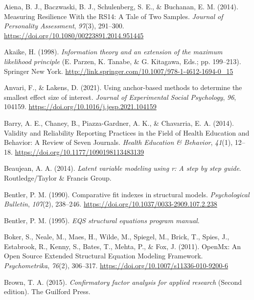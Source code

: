 \documentclass[
  man]{apa7}
\newlength{\cslhangindent}
\newlength{\cslentryspacingunit} %
\newenvironment{CSLReferences}[2] %
 {%
  \setlength{\parindent}{0pt}
  \ifodd #1
  \let\oldpar\par
  \def\par{\hangindent=\cslhangindent\oldpar}
  \fi
  \setlength{\parskip}{#2\cslentryspacingunit}
 }%
 {}
\begin{document}
\hypertarget{refs}{}
\begin{CSLReferences}{1}{0}
\leavevmode{}%
Aiena, B. J., Baczwaski, B. J., Schulenberg, S. E., \& Buchanan, E. M. (2014). Measuring Resilience With the RS{\textendash}14: A Tale of Two Samples. \emph{Journal of Personality Assessment}, \emph{97}(3), 291--300. \url{https://doi.org/10.1080/00223891.2014.951445}

\leavevmode{}%
Akaike, H. (1998). \emph{Information theory and an extension of the maximum likelihood principle} (E. Parzen, K. Tanabe, \& G. Kitagawa, Eds.; pp. 199--213). Springer New York. \url{http://link.springer.com/10.1007/978-1-4612-1694-0_15}

\leavevmode{}%
Anvari, F., \& Lakens, D. (2021). Using anchor-based methods to determine the smallest effect size of interest. \emph{Journal of Experimental Social Psychology}, \emph{96}, 104159. \url{https://doi.org/10.1016/j.jesp.2021.104159}

\leavevmode{}%
Barry, A. E., Chaney, B., Piazza-Gardner, A. K., \& Chavarria, E. A. (2014). Validity and Reliability Reporting Practices in the Field of Health Education and Behavior: A Review of Seven Journals. \emph{Health Education \& Behavior}, \emph{41}(1), 12--18. \url{https://doi.org/10.1177/1090198113483139}

\leavevmode{}%
Beaujean, A. A. (2014). \emph{Latent variable modeling using r: A step by step guide}. Routledge/Taylor \& Francis Group.

\leavevmode{}%
Bentler, P. M. (1990). Comparative fit indexes in structural models. \emph{Psychological Bulletin}, \emph{107}(2), 238--246. \url{https://doi.org/10.1037/0033-2909.107.2.238}

\leavevmode{}%
Bentler, P. M. (1995). \emph{EQS structural equations program manual}.

\leavevmode{}%
Boker, S., Neale, M., Maes, H., Wilde, M., Spiegel, M., Brick, T., Spies, J., Estabrook, R., Kenny, S., Bates, T., Mehta, P., \& Fox, J. (2011). OpenMx: An Open Source Extended Structural Equation Modeling Framework. \emph{Psychometrika}, \emph{76}(2), 306--317. \url{https://doi.org/10.1007/s11336-010-9200-6}

\leavevmode{}%
Brown, T. A. (2015). \emph{Confirmatory factor analysis for applied research} (Second edition). The Guilford Press.


\end{CSLReferences}
\end{document}
